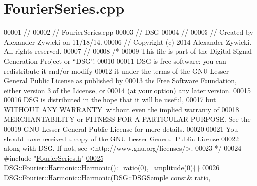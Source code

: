 \hypertarget{_fourier_series_8cpp_source}{\section{Fourier\+Series.\+cpp}
\label{_fourier_series_8cpp_source}
}

\begin{DoxyCode}
00001 \textcolor{comment}{//}
00002 \textcolor{comment}{//  FourierSeries.cpp}
00003 \textcolor{comment}{//  DSG}
00004 \textcolor{comment}{//}
00005 \textcolor{comment}{//  Created by Alexander Zywicki on 11/18/14.}
00006 \textcolor{comment}{//  Copyright (c) 2014 Alexander Zywicki. All rights reserved.}
00007 \textcolor{comment}{//}
00008 \textcolor{comment}{/*}
00009 \textcolor{comment}{ This file is part of the Digital Signal Generation Project or “DSG”.}
00010 \textcolor{comment}{}
00011 \textcolor{comment}{ DSG is free software: you can redistribute it and/or modify}
00012 \textcolor{comment}{ it under the terms of the GNU Lesser General Public License as published by}
00013 \textcolor{comment}{ the Free Software Foundation, either version 3 of the License, or}
00014 \textcolor{comment}{ (at your option) any later version.}
00015 \textcolor{comment}{}
00016 \textcolor{comment}{ DSG is distributed in the hope that it will be useful,}
00017 \textcolor{comment}{ but WITHOUT ANY WARRANTY; without even the implied warranty of}
00018 \textcolor{comment}{ MERCHANTABILITY or FITNESS FOR A PARTICULAR PURPOSE.  See the}
00019 \textcolor{comment}{ GNU Lesser General Public License for more details.}
00020 \textcolor{comment}{}
00021 \textcolor{comment}{ You should have received a copy of the GNU Lesser General Public License}
00022 \textcolor{comment}{ along with DSG.  If not, see <http://www.gnu.org/licenses/>.}
00023 \textcolor{comment}{ */}
00024 \textcolor{preprocessor}{#include "\hyperlink{_fourier_series_8h}{FourierSeries.h}"}
\hypertarget{_fourier_series_8cpp_source_l00025}{}\hyperlink{class_d_s_g_1_1_fourier_1_1_harmonic_a5433617eaac39402d27ce24634140940}{00025} \hyperlink{class_d_s_g_1_1_fourier_1_1_harmonic_a5433617eaac39402d27ce24634140940}{DSG::Fourier::Harmonic::Harmonic}():\_ratio(0),\_amplitude(0)\{\}
\hypertarget{_fourier_series_8cpp_source_l00026}{}\hyperlink{class_d_s_g_1_1_fourier_1_1_harmonic_a1dbca63f18e7271f78ad466bacdad394}{00026} \hyperlink{class_d_s_g_1_1_fourier_1_1_harmonic_a5433617eaac39402d27ce24634140940}{DSG::Fourier::Harmonic::Harmonic}(\hyperlink{namespace_d_s_g_ac39a94cd27ebcd9c1e7502d0c624894a}{DSG::DSGSample} \textcolor{keyword}{const}& ratio,

\end{DoxyCode}
